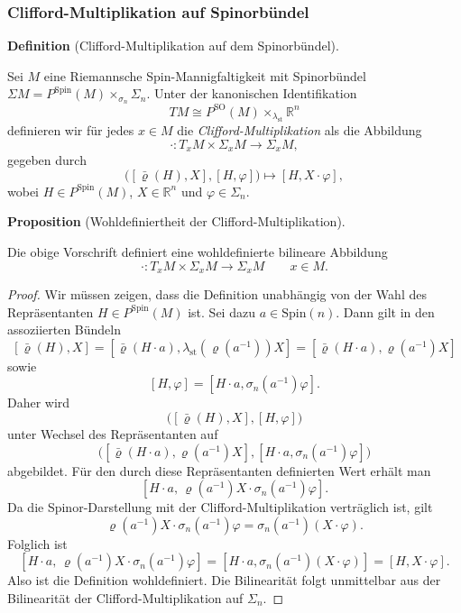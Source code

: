 \documentclass[10pt, letterpaper]{article}
\newcommand{\R}{\mathbb{R}}
\newcommand{\SO}{\mathrm{SO}}
\newcommand{\Spin}{\mathrm{Spin}}
\newcommand{\CustomHeading}[3]{%
  \par\medskip\noindent%
  \textbf{#1 #2} \textnormal{(#3)}.\enskip%
}
\newenvironment{DEF}[2]{\CustomHeading{Definition}{#1}{#2}}{}
\newenvironment{PROP}[2]{\CustomHeading{Proposition}{#1}{#2}}{}
\begin{document}
\subsubsection{Clifford-Multiplikation auf Spinorbündel}

\begin{DEF}{}{Clifford-Multiplikation auf dem Spinorbündel}
Sei \(M\) eine Riemannsche Spin-Mannigfaltigkeit mit Spinorbündel $\Sigma M=P^{\Spin}(M)\times_{\sigma_n}\Sigma_n$. Unter der kanonischen Identifikation
\[
TM \cong P^{\SO}(M)\times_{\lambda_{\mathrm{st}}}\R^n
\]
definieren wir für jedes \(x\in M\) die \emph{Clifford-Multiplikation} als die
Abbildung
\[
\cdot:T_xM\times \Sigma_xM\to \Sigma_xM,
\]
gegeben durch
\[
\bigl([\bar\varrho(H),X],[H,\varphi]\bigr)\longmapsto [H,X\cdot \varphi],
\]
wobei \(H\in P^{\Spin}(M)\), \(X\in \R^n\) und \(\varphi\in \Sigma_n\).
\end{DEF}

\begin{PROP}{}{Wohldefiniertheit der Clifford-Multiplikation}
Die obige Vorschrift definiert eine wohldefinierte bilineare Abbildung
\[
\cdot:T_xM\times \Sigma_xM\to \Sigma_xM
\qquad x\in M.
\]
\end{PROP}

\begin{proof}
Wir müssen zeigen, dass die Definition unabhängig von der Wahl des Repräsentanten
\(H\in P^{\Spin}(M)\) ist. Sei dazu \(a\in \Spin(n)\). Dann gilt in den
assoziierten Bündeln
\[
[\bar\varrho(H),X]
=
[\bar\varrho(H\cdot a),\lambda_{\mathrm{st}}(\varrho(a^{-1}))X]
=
[\bar\varrho(H\cdot a),\varrho(a^{-1})X]
\]
sowie
\[
[H,\varphi]=[H\cdot a,\sigma_n(a^{-1})\varphi].
\]
Daher wird
\[
\bigl([\bar\varrho(H),X],[H,\varphi]\bigr)
\]
unter Wechsel des Repräsentanten auf
\[
\bigl([\bar\varrho(H\cdot a),\varrho(a^{-1})X],[H\cdot a,\sigma_n(a^{-1})\varphi]\bigr)
\]
abgebildet. Für den durch diese Repräsentanten definierten Wert erhält man
\[
[H\cdot a,\,\varrho(a^{-1})X\cdot \sigma_n(a^{-1})\varphi].
\]
Da die Spinor-Darstellung mit der Clifford-Multiplikation verträglich ist, gilt
\[
\varrho(a^{-1})X\cdot \sigma_n(a^{-1})\varphi
=
\sigma_n(a^{-1})(X\cdot \varphi).
\]
Folglich ist
\[
[H\cdot a,\,\varrho(a^{-1})X\cdot \sigma_n(a^{-1})\varphi]
=
[H\cdot a,\sigma_n(a^{-1})(X\cdot \varphi)]
=
[H,X\cdot \varphi].
\]
Also ist die Definition wohldefiniert. Die Bilinearität folgt unmittelbar aus
der Bilinearität der Clifford-Multiplikation auf \(\Sigma_n\).
\end{proof}
\end{document}
